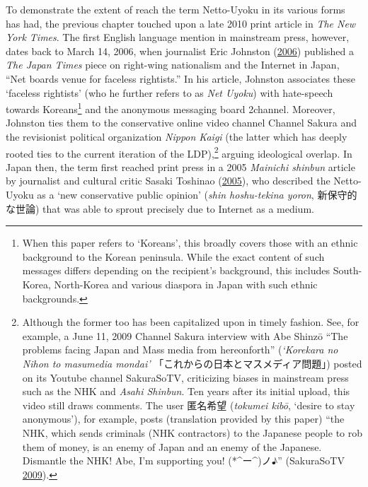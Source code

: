 \documentclass[10pt,british,A4paper,oneside]{memoir}
\begin{document}
To demonstrate the extent of reach the term Netto-Uyoku in its various
forms has had, the previous chapter touched upon a late 2010 print
article in \emph{The New York Times}. The first English language mention
in mainstream press, however, dates back to March 14, 2006, when
journalist Eric Johnston (\protect\hyperlink{ref-johnston_net_2006}{2006}) published a \emph{The Japan Times} piece on
right-wing nationalism and the Internet in Japan, ``Net boards venue for
faceless rightists.'' In his article, Johnston associates these
`faceless rightists' (who he further refers to as \emph{Net Uyoku}) with
hate-speech towards Koreans\footnote{When this paper refers to
  `Koreans', this broadly covers those with an ethnic background to the
  Korean peninsula. While the exact content of such messages differs
  depending on the recipient's background, this includes South-Korea,
  North-Korea and various diaspora in Japan with such ethnic backgrounds.} and
the anonymous messaging board 2channel. Moreover, Johnston ties them to
the conservative online video channel Channel Sakura and the revisionist
political organization \emph{Nippon Kaigi} (the latter which has deeply
rooted ties to the current iteration of the LDP),\footnote{Although the
  former too has been capitalized upon in timely fashion. See, for
  example, a June 11, 2009 Channel Sakura interview with Abe Shinzō
  ``The problems facing Japan and Mass media from hereonforth''
  (\emph{`Korekara no Nihon to masumedia mondai'}
  「これからの日本とマスメディア問題」) posted on its Youtube channel
  SakuraSoTV, criticizing biases in mainstream press such as the NHK and
  \emph{Asahi Shinbun}. Ten years after its initial upload, this video
  still draws comments. The user 匿名希望 (\emph{tokumei kibō}, `desire
  to stay anonymous'), for example, posts (translation provided by this paper) ``the
  NHK, which sends criminals (NHK contractors) to the Japanese people to
  rob them of money, is an enemy of Japan and an enemy of the Japanese.
  Dismantle the NHK! Abe, I'm supporting you! (*\^{}ー\^{})ノ♪''
  (SakuraSoTV \protect\hyperlink{ref-sakurasotv_eng._2009}{2009}).}
arguing ideological overlap. In Japan then, the term first reached print
press in a 2005 \emph{Mainichi shinbun} article by journalist and cultural critic Sasaki Toshinao (\protect\hyperlink{ref-sasaki_netto-uyoku_2005}{2005}), who described
the Netto-Uyoku as a `new conservative public opinion' (\emph{shin
hoshu-tekina yoron}, 新保守的な世論) that was able to sprout precisely
due to Internet as a medium.
\end{document}
